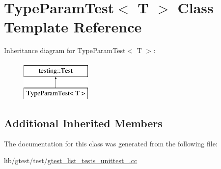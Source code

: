 \hypertarget{class_type_param_test}{\section{Type\-Param\-Test$<$ T $>$ Class Template Reference}
\label{class_type_param_test}
}
Inheritance diagram for Type\-Param\-Test$<$ T $>$\-:\begin{figure}[H]
\begin{center}
\leavevmode
\includegraphics[height=2.000000cm]{class_type_param_test}
\end{center}
\end{figure}
\subsection*{Additional Inherited Members}


The documentation for this class was generated from the following file\-:\begin{DoxyCompactItemize}
\item 
lib/gtest/test/\hyperlink{gtest__list__tests__unittest___8cc}{gtest\-\_\-list\-\_\-tests\-\_\-unittest\-\_\-.\-cc}\end{DoxyCompactItemize}
